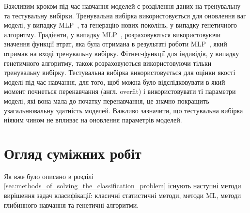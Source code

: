 Важливим кроком під час навчання моделей є розділення даних на тренувальну та тестувальну вибірки. Тренувальна вибірка використовується для оновлення ваг моделі, у випадку MLP~\cite{ct26}, та генерацію нових поколінь, у випадку генетичного алгоритму. Градієнти, у випадку MLP~\cite{ct26}, розраховуються використовуючи значення функції втрат, яка була отримана в результаті роботи MLP~\cite{ct26}, який отримав на вході тренувальну вибірку. Фітнес-функції для індивідів, у випадку генетичного алгоритму, також розраховуються використовуючи тільки тренувальну вибірку. Тестувальна вибірка використовується для оцінки якості моделі під час навчання, для того, щоб можна було відслідковувати в який момент почнеться перенавчання (англ. overfit) і використовувати ті параметри моделі, які вона мала до початку перенавчання, це значно покращить узагальнювальну здатність моделей. Важливо зазначити, що тестувальна вибірка ніяким чином не впливає на оновлення параметрів моделей.

\section{Огляд суміжних робіт}

Як вже було описано в розділі \ref{sec:methods_of_solving_the_classification_problem} існують наступні методи вирішення задач класифікації: класичні статистичні методи, методи ML, методи глибинного навчання та генетичні алгоритми.

